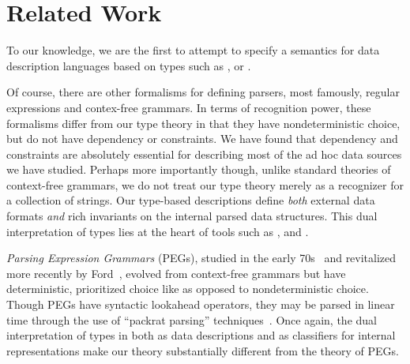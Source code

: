 \section{Related Work}
\label{sec:related}



To our knowledge, we are the first to attempt to specify a semantics for
data description languages based on types such as \packettypes{},
\datascript{} or \pads.  

Of course, there are other formalisms for
defining parsers, most famously, regular expressions and
contex-free grammars.  In terms of recognition power,
these formalisms differ from our type theory
in that they have nondeterministic choice, but do not have
dependency or constraints.  We have found that 
dependency and constraints are absolutely essential for
describing most of the ad hoc data sources we have studied.
Perhaps more importantly though, unlike standard theories of
context-free grammars,
we do not treat our type theory merely as a recognizer for
a collection of strings.  Our type-based descriptions 
define {\em both} external data formats {\em and} 
rich invariants on %
the internal parsed data structures.  This dual interpretation
of types lies at the heart of tools such as \pads, \datascript{} and
\packettypes{}.  

{\em Parsing Expression Grammars} (PEGs),
studied in the early 70s~\cite{birman+:parsing} and revitalized more 
recently by Ford~\cite{ford:pegs}, 
evolved from context-free grammars but
have deterministic, prioritized choice like \ddc{} as opposed to
nondeterministic choice.  Though PEGs have syntactic lookahead operators,
they may be parsed in linear time through the use of
``packrat parsing'' techniques~\cite{ford:packrat,grimm:packrat}.
Once again, the dual interpretation of types in \ddc{} both as
data descriptions and as classifiers for internal representations
make our theory substantially different from the theory of PEGs.

